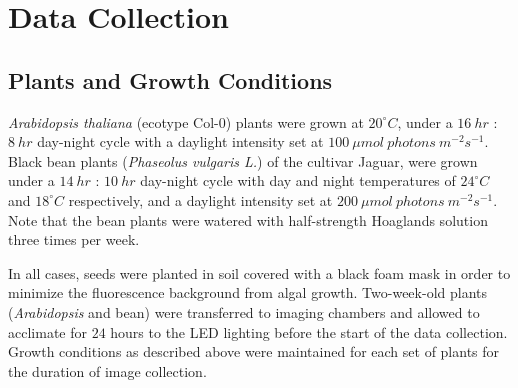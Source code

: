 \section{Data Collection}
\label{sec:2}

\subsection{Plants and Growth Conditions}

{\it Arabidopsis thaliana} (ecotype Col-$0$) plants were grown at $20^{\circ}C$, under a $16~hr$ : $8~hr$ day-night cycle with a daylight intensity set at $100~\mu mol~photons~m^{-2} s^{-1}$.
%
Black bean plants ({\it Phaseolus vulgaris L.}) of the cultivar Jaguar, were grown under a $14~hr$ : $10~hr$ day-night cycle with day and night temperatures of $24^{\circ}C$ and $18^{\circ}C$ respectively, and a daylight intensity set at $200~\mu mol~photons~m^{-2} s^{-1}$.
%
Note that the bean plants were watered with half-strength Hoaglands solution three times per week.

In all cases, seeds were planted in soil covered with a black foam mask in order to minimize the fluorescence background from algal growth.
%
Two-week-old plants ({\it Arabidopsis} and bean) were transferred to imaging chambers and allowed to acclimate for $24$ hours to the LED lighting before the start of the data collection.
Growth conditions as described above were maintained for each set of plants for the duration of image collection.
